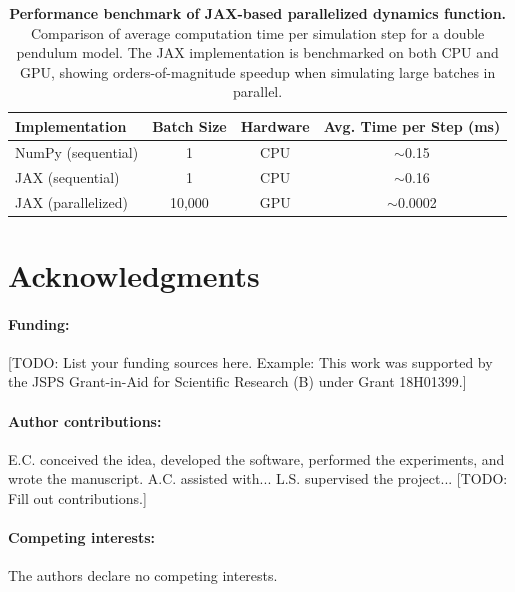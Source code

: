 \documentclass[12pt]{article}
\begin{document}

\begin{table}
	\centering
	\caption{\textbf{Performance benchmark of JAX-based parallelized dynamics function.}
    Comparison of average computation time per simulation step for a double pendulum model. The JAX implementation is benchmarked on both CPU and GPU, showing orders-of-magnitude speedup when simulating large batches in parallel.}
	\label{tab:jax_performance}
	
	\begin{tabular}{lccc}
		\\
		\hline
		Implementation & Batch Size & Hardware & Avg. Time per Step (ms) \\
		\hline
		NumPy (sequential) & 1 & CPU & $\sim$0.15 \\
		JAX (sequential) & 1 & CPU & $\sim$0.16 \\
		JAX (parallelized) & 10,000 & GPU & $\sim$0.0002 \\
		\hline
	\end{tabular}
\end{table}




\clearpage






\section*{Acknowledgments}
\paragraph*{Funding:}
[TODO: List your funding sources here. Example: This work was supported by the JSPS Grant-in-Aid for Scientific Research (B) under Grant 18H01399.]
\paragraph*{Author contributions:}
E.C. conceived the idea, developed the software, performed the experiments, and wrote the manuscript. A.C. assisted with... L.S. supervised the project... [TODO: Fill out contributions.]
\paragraph*{Competing interests:}
The authors declare no competing interests.
\end{document}
